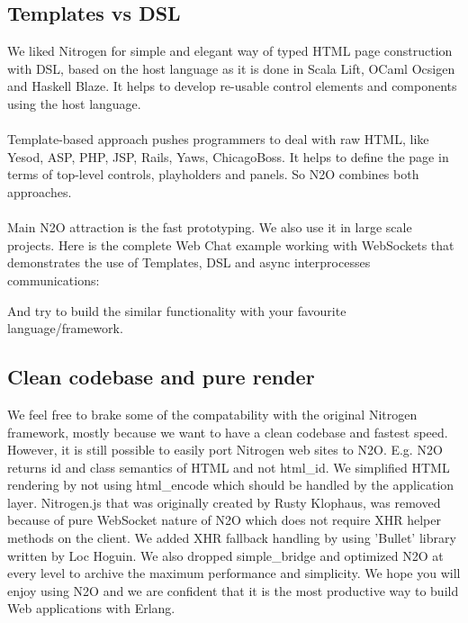 \documentclass[11pt]{article}
\begin{document}
\subsection*{Templates vs DSL}
We liked Nitrogen for simple and elegant way of typed HTML page
construction with DSL, based on the host language as it is done in Scala Lift,
OCaml Ocsigen and Haskell Blaze. It helps to develop re-usable control
elements and components using the host language.
\paragraph{}
Template-based approach pushes programmers to deal with raw HTML,
like Yesod, ASP, PHP, JSP, Rails, Yaws, ChicagoBoss. It helps to
define the page in terms of top-level controls, playholders
and panels. So N2O combines both approaches.
\paragraph{}
Main N2O attraction is the fast prototyping. We also use it in large
scale projects. Here is the complete Web Chat example working with
WebSockets that demonstrates the use of Templates, DSL and async
interprocesses communications:


And try to build the similar functionality with your favourite language/framework.

\subsection*{Clean codebase and pure render}
We feel free to brake some of the compatability with the original
Nitrogen framework, mostly because we want to have a clean codebase
and fastest speed. However, it is still possible to easily port
Nitrogen web sites to N2O. E.g. N2O returns id and class semantics
of HTML and not html_id. We simplified HTML rendering by not using
html_encode which should be handled by the application layer.
Nitrogen.js that was originally created by Rusty Klophaus,
was removed because of pure WebSocket nature of N2O which does not
require XHR helper methods on the client. We added XHR fallback
handling by using 'Bullet' library written by Loc Hoguin.
We also dropped simple_bridge and optimized N2O at every level to
archive the maximum performance and simplicity. We hope you will enjoy
using N2O and we are confident that it is the most productive way to
build Web applications with Erlang.








\end{document}
